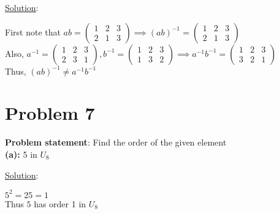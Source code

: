 \documentclass{article} %
\begin{document}
\underline{Solution}: 
\begin{addmargin}[1em]{0em}
First note that $ab = \left( \begin{matrix} 1 & 2 & 3 \\ 2 & 1 & 3 \end{matrix} \right) \implies (ab)^{-1} = \left( \begin{matrix} 1 & 2 & 3 \\ 2 & 1 & 3\end{matrix} \right)$
\\Also, $a^{-1} = \left( \begin{matrix} 1 & 2 & 3 \\ 2 & 3 & 1 \end{matrix} \right), b^{-1} = \left( \begin{matrix} 1 & 2 & 3 \\ 1 & 3 & 2 \end{matrix}\right) \implies a^{-1}b^{-1} = \left( \begin{matrix} 1 & 2 & 3 \\ 3 & 2 & 1 \end{matrix} \right)$
\\Thus, $(ab)^{-1} \neq a^{-1}b^{-1}$
\end{addmargin}    

\newpage
\section*{Problem 7}


\textbf{Problem statement}: Find the order of the given element
\\

\textbf{(a): } 5 in $U_8$
\begin{addmargin}[1em]{0em}
\underline{Solution}: 
\begin{addmargin}[1em]{0em}
$5^2 = 25 = 1$
\\Thus $5$ has order 1 in $U_8$
\end{addmargin}
\end{addmargin}    
\end{document}

